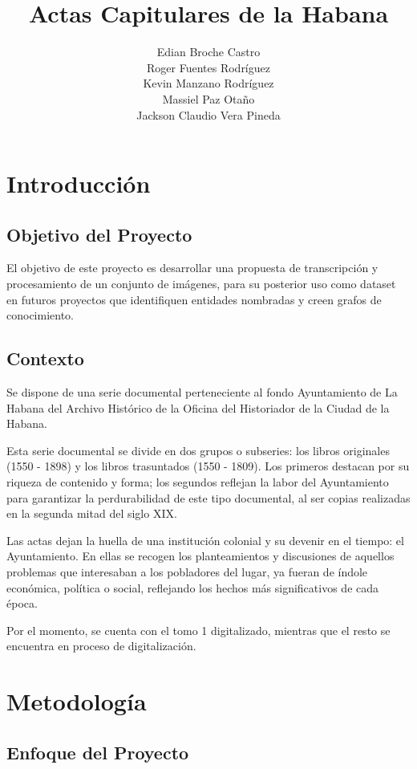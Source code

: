 \documentclass[11pt,a4paper]{article}
\title{Actas Capitulares de la Habana}
\author{Edian Broche Castro \\ Roger Fuentes Rodr\'iguez \\ Kevin Manzano Rodr\'iguez \\ Massiel Paz Otaño \\ Jackson Claudio Vera Pineda}
\date{}
\begin{document}
\maketitle

\tableofcontents

\section{Introducción}
\subsection{Objetivo del Proyecto} 

El objetivo de este proyecto es desarrollar una propuesta de transcripción y procesamiento de un conjunto de imágenes, para su posterior uso como dataset en futuros proyectos que identifiquen entidades nombradas y creen grafos de conocimiento.  

\subsection{Contexto}

Se dispone de una serie documental perteneciente al fondo Ayuntamiento de La Habana del Archivo Histórico de la Oficina del Historiador de la Ciudad de la Habana.

Esta serie documental se divide en dos grupos o subseries: los libros originales (1550 - 1898) y los libros trasuntados (1550 - 1809). Los primeros destacan por su riqueza de contenido y forma; los segundos reflejan la labor del Ayuntamiento para garantizar la perdurabilidad de este tipo documental, al ser copias realizadas en la segunda mitad del siglo XIX.

Las actas dejan la huella de una institución colonial y su devenir en el tiempo: el Ayuntamiento. En ellas se recogen los planteamientos y discusiones de aquellos problemas que interesaban a los pobladores del lugar, ya fueran de índole económica, política o social, reflejando los hechos más significativos de cada época.

Por el momento, se cuenta con el tomo 1 digitalizado, mientras que el resto se encuentra en proceso de digitalización.

\section{Metodología}
\subsection{Enfoque del Proyecto}
\end{document}
